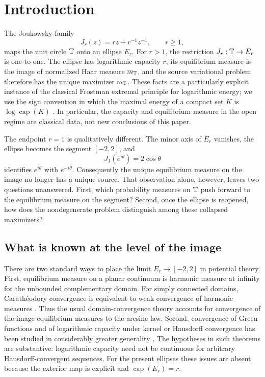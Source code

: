 \section{Introduction}\label{sec:introduction}

The Joukowsky family
\begin{equation}\label{eq:intro-joukowsky}
 J_r(z)=rz+r^{-1}z^{-1},\qquad r\geq1,
\end{equation}
maps the unit circle \(\mathbb{T}\) onto an ellipse \(E_r\).  For \(r>1\),
the restriction \(J_r:\mathbb{T}\to E_r\) is one-to-one.  The ellipse has
logarithmic capacity \(r\), its equilibrium measure is the image of
normalized Haar measure \(m_{\mathbb{T}}\), and the source variational problem
therefore has the unique maximizer \(m_{\mathbb{T}}\).  These facts are a
particularly explicit instance of the classical Frostman extremal
principle for logarithmic energy; we use the sign convention in which
the maximal energy of a compact set \(K\) is
\(\log\operatorname{cap}(K)\) \citep{Ransford1995,SaffTotik1997}.
In particular, the capacity and equilibrium measure in the open regime
are classical data, not new conclusions of this paper.

The endpoint \(r=1\) is qualitatively different.  The minor axis of
\(E_r\) vanishes, the ellipse becomes the segment \([-2,2]\), and
\[
 J_1(e^{i\theta})=2\cos\theta
\]
identifies \(e^{i\theta}\) with \(e^{-i\theta}\).  Consequently the
unique equilibrium measure on the image no longer has a unique source.
That observation alone, however, leaves two questions unanswered.
First, which probability measures on \(\mathbb{T}\) push forward to the
equilibrium measure on the segment?  Second, once the ellipse is
reopened, how does the nondegenerate problem distinguish among these
collapsed maximizers?

\subsection*{What is known at the level of the image}

There are two standard ways to place the limit \(E_r\to[-2,2]\) in
potential theory.  First, equilibrium measure on a planar continuum is
harmonic measure at infinity for the unbounded complementary domain.
For simply connected domains, Carath\'eodory convergence is equivalent
to weak convergence of harmonic measures
\citep{BinderRojasYampolsky2019}.  Thus the usual domain-convergence
theory accounts for convergence of the image equilibrium measures to
the arcsine law.  Second, convergence of Green functions and of
logarithmic capacity under kernel or Hausdorff convergence has been
studied in considerably greater generality
\citep{KalmykovKovalev2019,KalmykovKovalev2022}.  The hypotheses in
such theorems are substantive: logarithmic capacity need not be
continuous for arbitrary Hausdorff-convergent sequences.  For the
present ellipses these issues are absent because the exterior map is
explicit and \(\operatorname{cap}(E_r)=r\).

